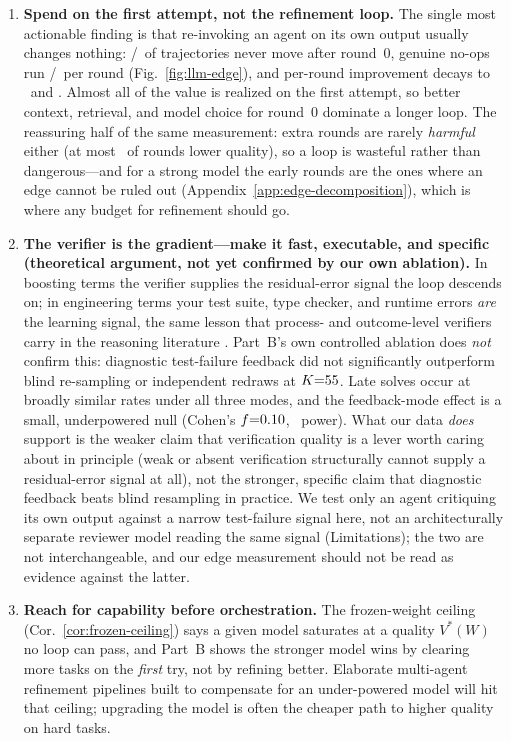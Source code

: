 \begin{enumerate}[leftmargin=*,itemsep=3pt]
    \item \textbf{Spend on the first attempt, not the refinement loop.} The single most actionable finding is that re-invoking an agent on its own output usually changes nothing: \statPBHaikuFlat/\statPBSonnetFlat\ of trajectories never move after round~0, genuine no-ops run \statPBHaikuGenuineTieRange/\statPBSonnetGenuineTieRange\ per round (Fig.~\ref{fig:llm-edge}), and per-round improvement decays to \statPBHaikuEta\ and \statPBSonnetEta. Almost all of the value is realized on the first attempt, so better context, retrieval, and model choice for round~0 dominate a longer loop. The reassuring half of the same measurement: extra rounds are rarely \emph{harmful} either (at most \statPBRegressMax\ of rounds lower quality), so a loop is wasteful rather than dangerous---and for a strong model the early rounds are the ones where an edge cannot be ruled out (Appendix~\ref{app:edge-decomposition}), which is where any budget for refinement should go.
    \item \textbf{The verifier is the gradient---make it fast, executable, and specific (theoretical argument, not yet confirmed by our own ablation).} In boosting terms the verifier supplies the residual-error signal the loop descends on; in engineering terms your test suite, type checker, and runtime errors \emph{are} the learning signal, the same lesson that process- and outcome-level verifiers carry in the reasoning literature \citep{lightman2023verify}. Part~B's own controlled ablation does \emph{not} confirm this: diagnostic test-failure feedback did not significantly outperform blind re-sampling or independent redraws at $K{=}55$. Late solves occur at broadly similar rates under all three modes, and the feedback-mode effect is a small, underpowered null (Cohen's $f{=}0.10$, \statPBModePower\ power). What our data \emph{does} support is the weaker claim that verification quality is a lever worth caring about in principle (weak or absent verification structurally cannot supply a residual-error signal at all), not the stronger, specific claim that diagnostic feedback beats blind resampling in practice. We test only an agent critiquing its own output against a narrow test-failure signal here, not an architecturally separate reviewer model reading the same signal (Limitations); the two are not interchangeable, and our edge measurement should not be read as evidence against the latter.
    \item \textbf{Reach for capability before orchestration.} The frozen-weight ceiling (Cor.~\ref{cor:frozen-ceiling}) says a given model saturates at a quality $V^*(W)$ no loop can pass, and Part~B shows the stronger model wins by clearing more tasks on the \emph{first} try, not by refining better. Elaborate multi-agent refinement pipelines built to compensate for an under-powered model will hit that ceiling; upgrading the model is often the cheaper path to higher quality on hard tasks.

\end{enumerate}
